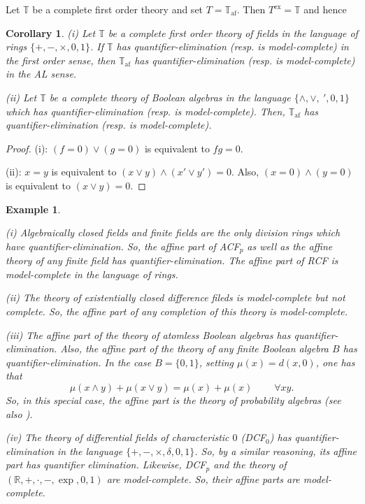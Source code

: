 \documentclass[12pt]{article}
\newtheorem{corollary}[theorem]{Corollary}
\newtheorem{example}[theorem]{Example}
\def\Rn{\mathbb R}
\begin{document}
Let $\mathbb{T}$ be a complete first order theory and set $T=\mathbb{T}_{\textrm{af}}$.
Then $T^{\textrm{ex}}=\mathbb{T}$ and hence

\begin{corollary}
(i) Let $\mathbb{T}$ be a complete first order theory of fields in the language of rings $\{+,-,\times,0,1\}$.
If $\mathbb{T}$ has quantifier-elimination (resp. is model-complete) in the first order sense,
then $\mathbb{T}_{\textrm{af}}$ has quantifier-elimination (resp. is model-complete) in the AL sense.

(ii) Let $\mathbb{T}$ be a complete theory of Boolean algebras in the language $\{\wedge,\vee,\ ',0,1\}$
which has quantifier-elimination (resp. is model-complete).
Then, $\mathbb{T}_{\textrm{af}}$ has quantifier-elimination (resp. is model-complete).
\end{corollary}
\begin{proof}
(i): $(f=0)\vee(g=0)$ is equivalent to $fg=0$.

(ii): $x=y$ is equivalent to $(x\vee y)\wedge(x'\vee y')=0$.
Also, $(x=0)\wedge(y=0)$ is equivalent to $(x\vee y)=0$.
\end{proof}

\begin{example}
\em{(i) Algebraically closed fields and finite fields are the only division rings which have quantifier-elimination.
So, the affine part of ACF$_p$ as well as the affine theory of any finite field has quantifier-elimination.
The affine part of RCF is model-complete in the language of rings.

(ii) The theory of existentially closed difference fileds is model-complete but not complete.
So, the affine part of any completion of this theory is model-complete.

(iii) The affine part of the theory of atomless Boolean algebras has quantifier-elimination.
Also, the affine part of the theory of any finite Boolean algebra $B$ has quantifier-elimination.
In the case $B=\{0,1\}$, setting $\mu(x)=d(x,0)$, one has that
$$\mu(x\wedge y)+\mu(x\vee y)=\mu(x)+\mu(x)\ \ \ \ \ \ \ \ \ \ \forall xy.$$
So, in this special case, the affine part is the theory of probability algebras (see also \cite{Bagheri-Lip}).}

(iv) The theory of differential fields of characteristic $0$ (DCF$_0$)
has quantifier-elimination in the language $\{+,-,\times,\delta,0,1\}$.
So, by a similar reasoning, its affine part has quantifier elimination.
Likewise, DCF$_p$ and the theory of $(\Rn,+,\cdot,-,\exp,0,1)$ are model-complete.
So, their affine parts are model-complete.
\end{example}
\end{document}
